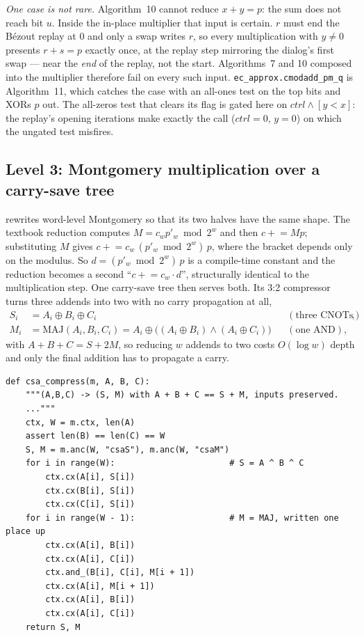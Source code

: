 \documentclass[11pt]{article}
\newcommand{\MAJ}{\mathrm{MAJ}}
\newcommand{\code}[1]{\texttt{#1}}
\theoremstyle{plain}
\theoremstyle{remark}
\begin{document}
\emph{One case is not rare.} Algorithm~10 cannot reduce $x+y=p$: the sum does not reach bit $u$.
Inside the in-place multiplier that input is certain. $r$ must end the B\'ezout replay at $0$ and
only a swap writes $r$, so every multiplication with $y\neq0$ presents $r+s=p$ exactly once, at the
replay step mirroring the dialog's first swap --- near the \emph{end} of the replay, not the start.
Algorithms~7 and 10 composed into the multiplier therefore fail on every such input.
\code{ec\_approx.cmodadd\_pm\_q} is Algorithm~11, which catches the case with an all-ones test on
the top bits and XORs $p$ out. The all-zeros test that clears its flag is gated here on
$\mathit{ctrl}\wedge[y<x]$: the replay's opening iterations make exactly the call
($\mathit{ctrl}=0$, $y=0$) on which the ungated test misfires.

\subsection{Level 3: Montgomery multiplication over a carry-save tree}\label{ec:sec:mont}

\cite{ec:kim26} rewrites word-level Montgomery so that its two halves have the same shape. The
textbook reduction computes $M=c_w p'_w \bmod 2^w$ and then $c \mathrel{+}= Mp$; substituting $M$
gives $c \mathrel{+}= c_w\,(p'_w \bmod 2^w)\,p$, where the bracket depends only on the modulus. So
$d=(p'_w\bmod 2^w)\,p$ is a compile-time constant and the reduction becomes a second
``$c \mathrel{+}= c_w\cdot d$'', structurally identical to the multiplication step. One carry-save
tree then serves both. Its 3:2 compressor turns three addends into two with no carry propagation at
all,
\[
\begin{aligned}
S_i &= A_i \oplus B_i \oplus C_i && (\text{three CNOTs}),\\
M_i &= \MAJ(A_i,B_i,C_i) = A_i \oplus \big((A_i{\oplus}B_i)\wedge(A_i{\oplus}C_i)\big) && (\text{one AND}),
\end{aligned}
\]
with $A+B+C=S+2M$, so reducing $w$ addends to two costs $O(\log w)$ depth and only the final
addition has to propagate a carry.

\begin{lstlisting}
def csa_compress(m, A, B, C):
    """(A,B,C) -> (S, M) with A + B + C == S + M, inputs preserved.
    ..."""
    ctx, W = m.ctx, len(A)
    assert len(B) == len(C) == W
    S, M = m.anc(W, "csaS"), m.anc(W, "csaM")
    for i in range(W):                       # S = A ^ B ^ C
        ctx.cx(A[i], S[i])
        ctx.cx(B[i], S[i])
        ctx.cx(C[i], S[i])
    for i in range(W - 1):                   # M = MAJ, written one place up
        ctx.cx(A[i], B[i])
        ctx.cx(A[i], C[i])
        ctx.and_(B[i], C[i], M[i + 1])
        ctx.cx(A[i], M[i + 1])
        ctx.cx(A[i], B[i])
        ctx.cx(A[i], C[i])
    return S, M
\end{lstlisting}
\end{document}
